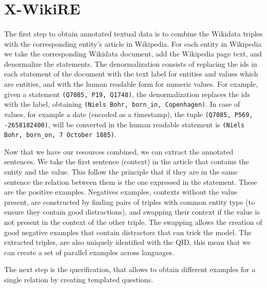 
\section{X-WikiRE}
\paragraph{}
The first step to obtain annotated textual data is to combine the Wikidata triples with the corresponding entity's article in Wikipedia. For each entity in Wikipedia we  take  the  corresponding  Wikidata  document, add  the  Wikipedia  page  text,  and  denormalize the  statements. The denormalization consists  of  replacing  the ids in  each  statement  of  the document with the text label for entities and values which are entities,  and  with  the  human  readable  form  for numeric values. For example, given a statement \texttt{(Q7085, P19, Q1748)}, the denormalization replaces the ids with the label, obtaining \texttt{(Niels Bohr, born\_in, Copenhagen)}. In case of values, for example a date (encoded as a timestamp), the tuple \texttt{(Q7085, P569, -2658182400)}, will be converted in the human readable statement is \texttt{(Niels Bohr, born\_on, 7 October 1885)}. 

Now that we have our resources combined, we can extract the annotated sentences. We take the first sentence (context) in the article that contains the entity and the value. This follow the principle that if they are in the same sentence the relation between them is the one expressed in the statement. These are the positive examples. Negatives examples, contexts without the value present, are constructed by finding pairs of triples with common entity type (to ensure they contain good distractions), and swapping their context if the value is not present in the context of the other triple. The swapping allows the creation of good negative examples that contain distractors that can trick the model. The extracted triples, are also uniquely identified with the QID, this mean that we can create a set of parallel examples across languages. 

The next step is the querification, that allows to obtain different examples for a single relation by creating templated questions.

